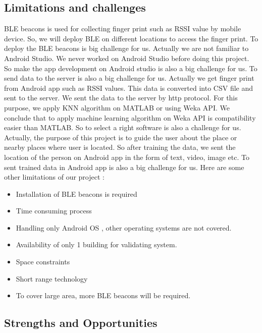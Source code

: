 \documentclass{article}
\begin{document}
\subsection{Limitations and challenges}
BLE beacons is used for collecting finger print such as RSSI value by mobile device. So, we will deploy BLE on different locations to access the finger print. To deploy the BLE beacons is big  challenge for us.
Actually we are not familiar to Android Studio. We never worked on Android Studio before doing this project. So make the app development on Android studio is also a big challenge for us. 
To send data to the server is also a big challenge for us. Actually we get finger print from Android app such as RSSI values. This data is converted into CSV file and sent to the server. We sent the data to the server by http protocol. 
For this purpose, we apply KNN algorithm on MATLAB or using Weka API. We conclude that to apply machine learning algorithm on Weka API is compatibility easier than MATLAB. So to select a right software is also a challenge for us. 
Actually, the purpose of this project is to guide the user about the place or nearby places where user is located. So after training the data, we sent the location of the person on Android app in the form of text, video, image etc. To sent trained data in Android app is also a big challenge for us. 
Here are some other limitations of our project : 
\begin{itemize}
\item Installation of BLE beacons is required
\item Time consuming process
\item Handling only Android OS , other operating systems are not covered.
\item Availability of only 1 building for validating system.
\item Space constraints
\item Short range technology
\item To cover large area, more BLE beacons will be required.
\end{itemize}
\subsection{Strengths and Opportunities}
\end{document}
